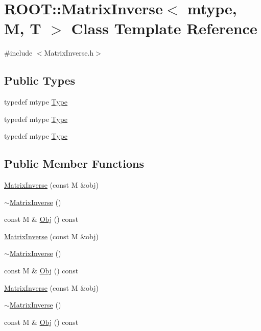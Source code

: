 \hypertarget{classROOT_1_1Minuit2_1_1MatrixInverse}{}\section{R\+O\+OT\+:\+:Matrix\+Inverse$<$ mtype, M, T $>$ Class Template Reference}
\label{classROOT_1_1Minuit2_1_1MatrixInverse}


{\ttfamily \#include $<$Matrix\+Inverse.\+h$>$}

\subsection*{Public Types}
\begin{DoxyCompactItemize}
\item 
typedef mtype \mbox{\hyperlink{classROOT_1_1Minuit2_1_1MatrixInverse_a71e683647f8cff3b0912eee539f039de}{Type}}
\item 
typedef mtype \mbox{\hyperlink{classROOT_1_1Minuit2_1_1MatrixInverse_a71e683647f8cff3b0912eee539f039de}{Type}}
\item 
typedef mtype \mbox{\hyperlink{classROOT_1_1Minuit2_1_1MatrixInverse_a71e683647f8cff3b0912eee539f039de}{Type}}
\end{DoxyCompactItemize}
\subsection*{Public Member Functions}
\begin{DoxyCompactItemize}
\item 
\mbox{\hyperlink{classROOT_1_1Minuit2_1_1MatrixInverse_a9baeca2e3357247472bd6c1a802f9549}{Matrix\+Inverse}} (const M \&obj)
\item 
\mbox{\hyperlink{classROOT_1_1Minuit2_1_1MatrixInverse_a190e28b4816e8bbce3fdd4b2122e89b4}{$\sim$\+Matrix\+Inverse}} ()
\item 
const M \& \mbox{\hyperlink{classROOT_1_1Minuit2_1_1MatrixInverse_a189a8ae3c36a989a47758de7aee4e181}{Obj}} () const
\item 
\mbox{\hyperlink{classROOT_1_1Minuit2_1_1MatrixInverse_a9baeca2e3357247472bd6c1a802f9549}{Matrix\+Inverse}} (const M \&obj)
\item 
\mbox{\hyperlink{classROOT_1_1Minuit2_1_1MatrixInverse_a190e28b4816e8bbce3fdd4b2122e89b4}{$\sim$\+Matrix\+Inverse}} ()
\item 
const M \& \mbox{\hyperlink{classROOT_1_1Minuit2_1_1MatrixInverse_a189a8ae3c36a989a47758de7aee4e181}{Obj}} () const
\item 
\mbox{\hyperlink{classROOT_1_1Minuit2_1_1MatrixInverse_a9baeca2e3357247472bd6c1a802f9549}{Matrix\+Inverse}} (const M \&obj)
\item 
\mbox{\hyperlink{classROOT_1_1Minuit2_1_1MatrixInverse_a190e28b4816e8bbce3fdd4b2122e89b4}{$\sim$\+Matrix\+Inverse}} ()
\item 
const M \& \mbox{\hyperlink{classROOT_1_1Minuit2_1_1MatrixInverse_a189a8ae3c36a989a47758de7aee4e181}{Obj}} () const
\end{DoxyCompactItemize}


